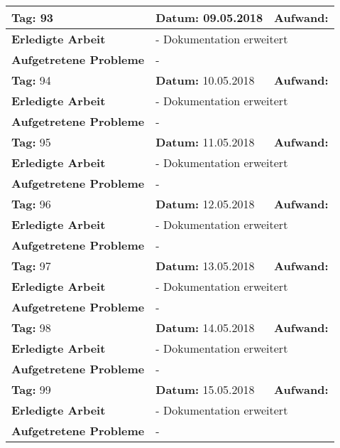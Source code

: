 \begin{longtable}{|p{5cm}|p{5cm}|p{6cm}|}
\rowcolor{heading}\textbf{Tag:} 93 & \textbf{Datum:} 09.05.2018 & \textbf{Aufwand:} \\ \hline
\textbf{Erledigte Arbeit} & \multicolumn{2}{p{11cm}|}{- Dokumentation erweitert} \\ \hline
\textbf{Aufgetretene Probleme} & \multicolumn{2}{p{11cm}|}{-} \\ \hline
\rowcolor{heading}\textbf{Tag:} 94 & \textbf{Datum:} 10.05.2018 & \textbf{Aufwand:} \\ \hline
\textbf{Erledigte Arbeit} & \multicolumn{2}{p{11cm}|}{- Dokumentation erweitert} \\ \hline
\textbf{Aufgetretene Probleme} & \multicolumn{2}{p{11cm}|}{-} \\ \hline
\rowcolor{heading}\textbf{Tag:} 95 & \textbf{Datum:} 11.05.2018 & \textbf{Aufwand:} \\ \hline
\textbf{Erledigte Arbeit} & \multicolumn{2}{p{11cm}|}{- Dokumentation erweitert} \\ \hline
\textbf{Aufgetretene Probleme} & \multicolumn{2}{p{11cm}|}{-} \\ \hline
\rowcolor{heading}\textbf{Tag:} 96 & \textbf{Datum:} 12.05.2018 & \textbf{Aufwand:} \\ \hline
\textbf{Erledigte Arbeit} & \multicolumn{2}{p{11cm}|}{- Dokumentation erweitert} \\ \hline
\textbf{Aufgetretene Probleme} & \multicolumn{2}{p{11cm}|}{-} \\ \hline
\rowcolor{heading}\textbf{Tag:} 97 & \textbf{Datum:} 13.05.2018 & \textbf{Aufwand:} \\ \hline
\textbf{Erledigte Arbeit} & \multicolumn{2}{p{11cm}|}{- Dokumentation erweitert} \\ \hline
\textbf{Aufgetretene Probleme} & \multicolumn{2}{p{11cm}|}{-} \\ \hline
\rowcolor{heading}\textbf{Tag:} 98 & \textbf{Datum:} 14.05.2018 & \textbf{Aufwand:} \\ \hline
\textbf{Erledigte Arbeit} & \multicolumn{2}{p{11cm}|}{- Dokumentation erweitert} \\ \hline
\textbf{Aufgetretene Probleme} & \multicolumn{2}{p{11cm}|}{-} \\ \hline
\rowcolor{heading}\textbf{Tag:} 99 & \textbf{Datum:} 15.05.2018 & \textbf{Aufwand:} \\ \hline
\textbf{Erledigte Arbeit} & \multicolumn{2}{p{11cm}|}{- Dokumentation erweitert} \\ \hline
\textbf{Aufgetretene Probleme} & \multicolumn{2}{p{11cm}|}{-} \\ \hline

\end{longtable}
